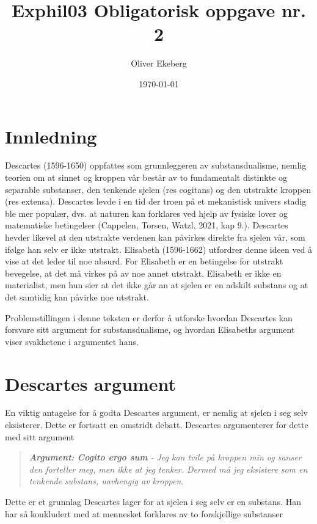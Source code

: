 \documentclass[12pt, a4paper]{article}
\title{Exphil03 Obligatorisk oppgave nr. 2}
\author{Oliver Ekeberg}
\date{\today}
\newenvironment{argument}{\begin{quote}\itshape\textbf{Argument: }}{\end{quote}}
\begin{document}
\maketitle

\tableofcontents


\section{Innledning}

Descartes (1596-1650) oppfattes som grunnleggeren av substansdualisme, nemlig teorien om at sinnet og kroppen vår består av to fundamentalt distinkte og separable substanser, den tenkende sjelen (res cogitans) og den utstrakte kroppen (res extensa). Descartes levde i en tid der troen på et mekanistisk univers stadig ble mer populær, dvs. at naturen kan forklares ved hjelp av fysiske lover og matematiske betingelser (Cappelen, Torsen, Watzl, 2021, kap 9.). Descartes hevder likevel at den utstrakte verdenen kan påvirkes direkte fra sjelen vår, som ifølge han selv er ikke utstrakt. Elisabeth (1596-1662) utfordrer denne ideen ved å vise at det leder til noe absurd. For Elisabeth er en betingelse for utstrakt bevegelse, at det må virkes på av noe annet utstrakt. Elisabeth er ikke en materialist, men hun sier at det ikke går an at sjelen er en adskilt substans og at det samtidig kan påvirke noe utstrakt.

\medskip
Problemstillingen i denne teksten er derfor å utforske hvordan Descartes kan forsvare sitt argument for substansdualisme, og hvordan Elisabeths argument viser svakhetene i argumentet hans.



\section{Descartes argument}

En viktig antagelse for å godta Descartes argument, er nemlig at sjelen i seg selv eksisterer. Dette er fortsatt en omstridt debatt. Descartes argumenterer for dette med sitt argument

\begin{argument}
    \textbf{\textit{Cogito ergo sum}} - Jeg kan tvile på kroppen min og sanser den forteller meg, men ikke at jeg tenker. Dermed må jeg eksistere som en tenkende substans, uavhengig av kroppen.
\end{argument}

Dette er et grunnlag Descartes lager for at sjelen i seg selv er en substans. Han har så konkludert med at mennesket forklares av to forskjellige substanser
\end{document}
